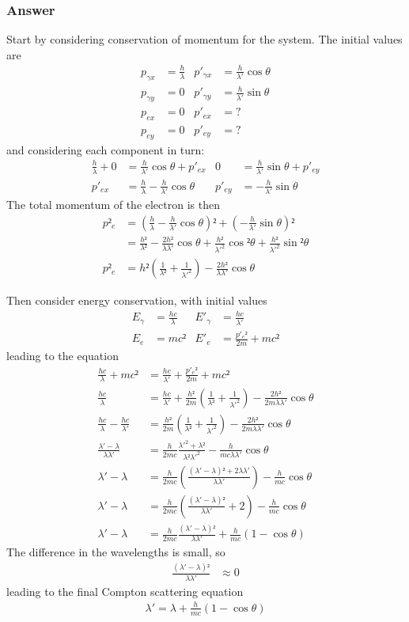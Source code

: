 \subsubsection{Answer}
Start by considering conservation of momentum for the system. The initial values
are
\begin{align*}
	p_{γx} &= \frac{h}{λ}		&		p'_{γx} &= \frac{h}{λ'} \cos θ \\
	p_{γy} &= 0					&		p'_{γy} &= \frac{h}{λ'} \sin θ \\
	p_{ex} &= 0					&		p'_{ex} &= ? \\
	p_{ey} &= 0					&		p'_{ey} &= ?
\end{align*}
and considering each component in turn:
\begin{align*}
	\frac{h}{λ} + 0 &= \frac{h}{λ'}\cos θ + p'_{ex}
		& 0 &= \frac{h}{λ'}\sin θ + p'_{ey}
	\\
	p'_{ex} &= \frac{h}{λ} - \frac{h}{λ'}\cos θ
		& p'_{ey} &= -\frac{h}{λ'}\sin θ
\end{align*}
The total momentum of the electron is then
\begin{align}
	p²_e &= \left( \frac{h}{λ} - \frac{h}{λ'}\cos θ \right)² +
		\left( -\frac{h}{λ'}\sin θ \right)²
		\nonumber
	\\
	{} &= \frac{h²}{λ²} - \frac{2h²}{λλ'}\cos θ + \frac{h²}{λ'^2}\cos ²θ +
		\frac{h²}{λ'^2}\sin ²θ
		\nonumber
	\\
	p²_e &= h² \left( \frac{1}{λ²} + \frac{1}{λ'^2} \right) -
		\frac{2h²}{λλ'}\cos θ
\end{align}

Then consider energy conservation, with initial values
\begin{align*}
	E_γ &= \frac{hc}{λ}			&		E'_γ &= \frac{hc}{λ'} \\
	E_e &= mc²					&		E'_e &= \frac{{p'_e}²}{2m} + mc²
\end{align*}
leading to the equation
\begin{align*}
	\frac{hc}{λ} + mc² &= \frac{hc}{λ'} + \frac{{p'_e}²}{2m} + mc²
	\\
	\frac{hc}{λ} &= \frac{hc}{λ'} + \frac{h²}{2m} \left( \frac{1}{λ²} +
		\frac{1}{λ'^2} \right) - \frac{2h²}{2mλλ'}\cos θ
	\\
	\frac{hc}{λ} - \frac{hc}{λ'} &= \frac{h²}{2m} \left( \frac{1}{λ²} +
		\frac{1}{λ'^2} \right) - \frac{2h²}{2mλλ'}\cos θ
	\\
	\frac{λ' - λ}{λλ'} &= \frac{h}{2mc} \frac{λ'^2 + λ²}{λ²{λ'}^2} -
		\frac{h}{mcλλ'}\cos θ
	\\
	λ' - λ &= \frac{h}{2mc} \left( \frac{(λ' - λ)² + 2λλ'}{λλ'} \right) -
		\frac{h}{mc}\cos θ
	\\
	λ' - λ &= \frac{h}{2mc} \left( \frac{(λ' - λ)²}{λλ'} + 2 \right) -
		\frac{h}{mc}\cos θ
	\\
	λ' - λ &= \frac{h}{2mc} \frac{(λ' - λ)²}{λλ'} + \frac{h}{mc}(1 - \cos θ)
\end{align*}
The difference in the wavelengths is small, so
\begin{align*}
	\frac{(λ' - λ)²}{λλ'} &≈ 0
\end{align*}
leading to the final Compton scattering equation
\begin{align}
	\boxed{
	λ' = λ + \frac{h}{mc}(1 - \cos θ)
	}
\end{align}
